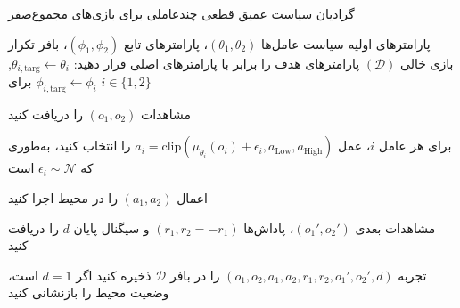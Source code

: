 \begin{algorithm}[H]
    \caption{گرادیان سیاست عمیق قطعی چند­عاملی برای بازی‌های مجموع­‌صفر}\label{alg:MA-DDPG}
    \begin{algorithmic}[1]
         پارامترهای اولیه سیاست عامل‌ها $(\theta_1, \theta_2)$، پارامترهای تابع  $(\phi_1, \phi_2)$، بافر تکرار بازی خالی $(\mathcal{D})$
        \State پارامترهای هدف را برابر با پارامترهای اصلی قرار دهید: $\theta_{i,\text{targ}} \leftarrow \theta_i$, $\phi_{i,\text{targ}} \leftarrow \phi_i$ برای $i \in \{1, 2\}$
        
            \State \parbox[t]{\dimexpr\linewidth-\algorithmicindent}{
            مشاهدات $(o_1, o_2)$ را دریافت کنید
            \strut}
            \State \parbox[t]{\dimexpr\linewidth-\algorithmicindent}{
            برای هر عامل $i$، عمل $a_i = \text{clip}(\mu_{\theta_i}(o_i) + \epsilon_i, a_{\text{Low}}, a_{\text{High}})$ را انتخاب کنید، به‌طوری که $\epsilon_i \sim \mathcal{N}$ است
            \strut}
            \State اعمال $(a_1, a_2)$ را در محیط اجرا کنید
            \State \parbox[t]{\dimexpr\linewidth-\algorithmicindent}{
            مشاهدات بعدی $(o_1', o_2')$، پاداش‌ها $(r_1, r_2=-r_1)$ و سیگنال پایان $d$ را دریافت کنید
            \strut}
            \State تجربه $(o_1, o_2, a_1, a_2, r_1, r_2, o_1', o_2', d)$ را در بافر $\mathcal{D}$ ذخیره کنید
            \State اگر $d=1$ است، وضعیت محیط را بازنشانی کنید
            

\end{algorithmic}
\end{algorithm}

